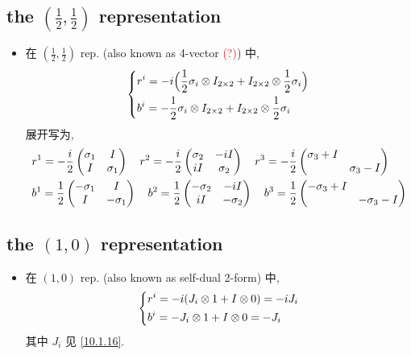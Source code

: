 \subsection{the \texorpdfstring{$(\frac{1}{2}, \frac{1}{2})$}{(1/2, 0)} representation}
\begin{itemize}
	\item 在 $(\frac{1}{2}, \frac{1}{2})$ rep. (also known as 4-vector \textcolor{red}{(?)}) 中,
	\begin{equation}
		\begin{dcases}
			r^i = - i \Big( \frac{1}{2} \sigma_i \otimes I_{2 \times 2} + I_{2 \times 2} \otimes \frac{1}{2} \sigma_i \Big) \\
			b^i = - \frac{1}{2} \sigma_i \otimes I_{2 \times 2} + I_{2 \times 2} \otimes \frac{1}{2} \sigma_i
		\end{dcases}
	\end{equation}
	展开写为,
	\begin{align}
		& r^1 = - \frac{i}{2} \begin{pmatrix}
			\sigma_1 & I \\
			I & \sigma_1
		\end{pmatrix} \quad r^2 = - \frac{i}{2} \begin{pmatrix}
			\sigma_2 & - i I \\
			i I & \sigma_2
		\end{pmatrix} \quad r^3 = - \frac{i}{2} \begin{pmatrix}
			\sigma_3 + I & \\
			& \sigma_3 - I
		\end{pmatrix} \notag \\
		& b^1 = \frac{1}{2} \begin{pmatrix}
			- \sigma_1 & I \\
			I & - \sigma_1
		\end{pmatrix} \quad b^2 = \frac{1}{2} \begin{pmatrix}
			- \sigma_2 & - i I \\
			i I & - \sigma_2
		\end{pmatrix} \quad b^3 = \frac{1}{2} \begin{pmatrix}
			- \sigma_3 + I & \\
			& - \sigma_3 - I
		\end{pmatrix}
	\end{align}
\end{itemize}

\subsection{the \texorpdfstring{$(1, 0)$}{(1, 0)} representation}
\begin{itemize}
	\item 在 $(1, 0)$ rep. (also known as self-dual 2-form) 中,
	\begin{equation}
		\begin{dcases}
			r^i = - i (J_i \otimes 1 + I \otimes 0) = - i J_i \\
			b^i = - J_i \otimes 1 + I \otimes 0 = - J_i
		\end{dcases}
	\end{equation}
	其中 $J_i$ 见 \eqref{10.1.16}.
\end{itemize}

